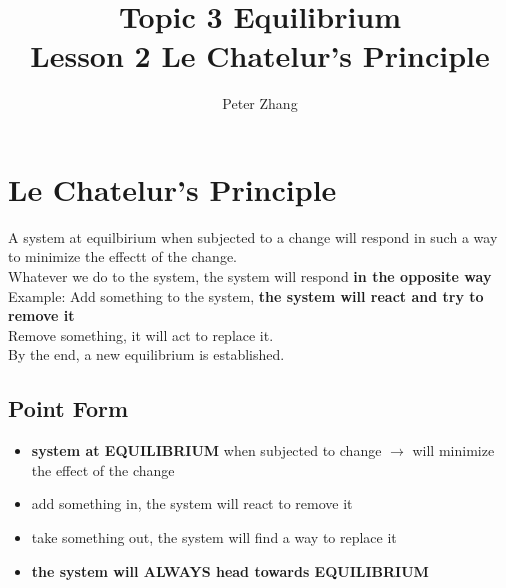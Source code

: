 \documentclass{article}
\title{Topic 3 Equilibrium\\Lesson 2 Le Chatelur's Principle}
\author{Peter Zhang}
\begin{document}
\maketitle
\newpage
\tableofcontents
\newpage

\section{Le Chatelur's Principle}
A system at equilbirium when subjected to a change will respond in such a way to minimize the effectt of the change.\\Whatever we do to the system, the system will respond \textbf{in the opposite way}\\Example: Add something to the system, \textbf{the system will react and try to remove it}\\Remove something, it will act to replace it.\\By the end, a new equilibrium is established.

\subsection{Point Form}
\begin{itemize}
\item \textbf{system at EQUILIBRIUM} when subjected to change $\rightarrow$ will minimize the effect of the change
\item add something in, the system will react to remove it
\item take something out, the system will find a way to replace it
\item \textbf{the system will ALWAYS head towards EQUILIBRIUM}
\end{itemize}


\pagebreak
\end{document}
